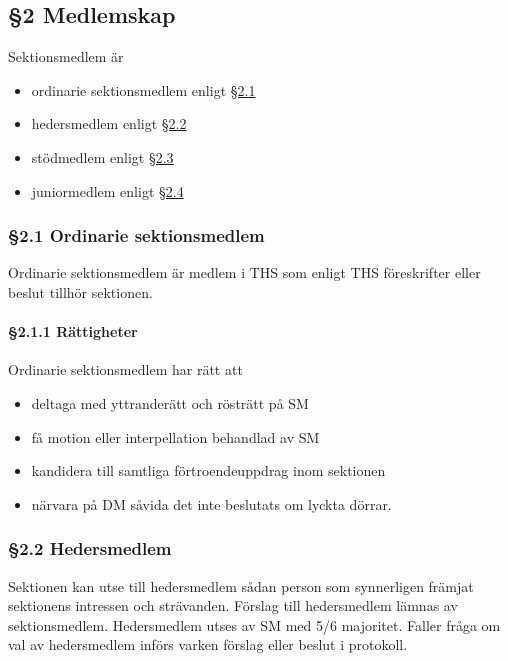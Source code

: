 \subsection{§2 Medlemskap}

Sektionsmedlem är

\begin{itemize}
  \item ordinarie sektionsmedlem enligt \href{#ordinarie_sektionsmedlem}{§2.1}
  \item hedersmedlem enligt \href{#hedersmedlem}{§2.2}
  \item stödmedlem enligt \href{#stodmedlem}{§2.3}
  \item juniormedlem enligt \href{#juniormedlem}{§2.4}
\end{itemize}

\subsubsection{§2.1 Ordinarie sektionsmedlem}

Ordinarie sektionsmedlem är medlem i THS som enligt THS föreskrifter eller beslut tillhör sektionen.

\paragraph{§2.1.1 Rättigheter}

Ordinarie sektionsmedlem har rätt att

\begin{itemize}
  \item deltaga med yttranderätt och rösträtt på SM
  \item få motion eller interpellation behandlad av SM
  \item kandidera till samtliga förtroendeuppdrag inom sektionen
  \item närvara på DM såvida det inte beslutats om lyckta dörrar.
\end{itemize}

\subsubsection{§2.2 Hedersmedlem}

Sektionen kan utse till hedersmedlem sådan person som synnerligen främjat sektionens intressen och strävanden. Förslag till hedersmedlem lämnas av sektionsmedlem. Hedersmedlem utses av SM med 5/6 majoritet. Faller fråga om val av hedersmedlem införs varken förslag eller beslut i protokoll.

